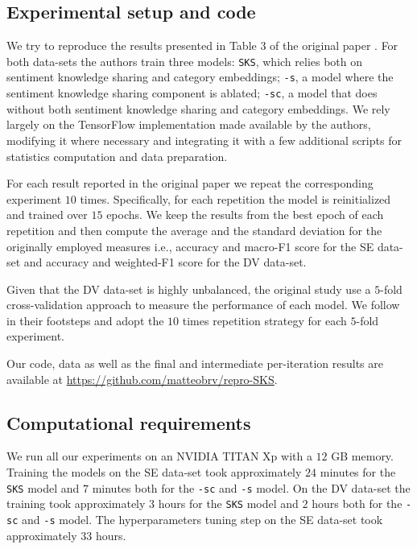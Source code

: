 \subsection{Experimental setup and code}
We try to reproduce the results presented in Table $3$ of the original paper \cite{original:zhou}. For both data-sets the authors train three models: \texttt{SKS}, which relies both on sentiment knowledge sharing and category embeddings; \texttt{-s}, a model where the sentiment knowledge sharing component is ablated; \texttt{-sc}, a model that does without both sentiment knowledge sharing and category embeddings. We rely largely on the TensorFlow  \cite{tensorflow2015} implementation made available by the authors, modifying it where necessary and integrating it with a few additional scripts for statistics computation and data preparation.

For each result reported in the original paper we repeat the corresponding experiment $10$ times. Specifically, for each repetition the model is reinitialized and trained over $15$ epochs. We keep the results from the best epoch of each repetition and then compute the average and the standard deviation for the originally employed measures i.e., accuracy and macro-F1 score for the SE data-set and accuracy and weighted-F1 score for the DV data-set.

Given that the DV data-set is highly unbalanced, the original study use a $5$-fold cross-validation approach to measure the performance of each model. We follow in their footsteps and adopt the $10$ times repetition strategy for each $5$-fold experiment.

Our code, data as well as the final and intermediate per-iteration results are available at 
\url{https://github.com/matteobrv/repro-SKS}.


\subsection{Computational requirements}
We run all our experiments on an NVIDIA TITAN Xp with a $12$ GB memory. Training the models on the SE data-set took approximately $24$ minutes for the \texttt{SKS} model and $7$ minutes both for the \texttt{-sc} and \texttt{-s} model.
On the DV data-set the training took approximately $3$ hours for the \texttt{SKS} model and $2$ hours both for the \texttt{-sc} and \texttt{-s} model. The hyperparameters tuning step on the SE data-set took approximately $33$ hours.
 


